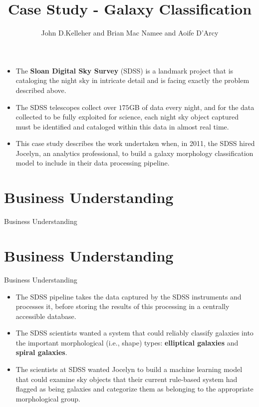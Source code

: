 \documentclass[xcolor={table}]{beamer}
\title{Case Study - Galaxy Classification}
\author{John D.Kelleher and Brian Mac Namee and Aoife D'Arcy}
\institute{}
\date{}
\newcommand{\SectionSlide}[2][]{
	\ifthenelse{\isempty{#1}}
		{\section{#2}\begin{frame} \begin{center}\begin{huge}#2\end{huge}\end{center}\end{frame}}
		{\section[#1]{#2}\begin{frame} \begin{center}\begin{huge}#2\end{huge}\end{center}\end{frame}}
}
\newcommand{\keyword}[1]{\alert{\textbf{#1}}\index{#1}}
\begin{document}
\begin{frame}
	\titlepage
\end{frame}
\begin{frame}
	 \tableofcontents
\end{frame}


 \begin{frame} 
 \begin{itemize}
\item The \keyword{Sloan Digital Sky Survey} (SDSS) is a landmark project that is cataloging the night sky in intricate detail and is facing exactly the problem described above.
\item The SDSS telescopes collect over $175$GB of data every night, and for the data collected to be fully exploited for science, each night sky object captured must be identified and cataloged within this data in almost real time. 
\item This case study describes the work undertaken when, in 2011, the SDSS hired Jocelyn, an analytics professional, to build a galaxy morphology classification model to include in their data processing pipeline. 
\end{itemize}
\end{frame} 


\SectionSlide{Business  Understanding}

 \begin{frame} 
 \begin{itemize}
\item The SDSS pipeline takes the data captured by the SDSS instruments and processes it, before storing the results of this processing in a centrally accessible database. 
\item The SDSS scientists wanted a system that could reliably classify galaxies into the important morphological (i.e., shape) types:  \textbf{elliptical galaxies} and \textbf{spiral galaxies}. 
\item The scientists at SDSS wanted Jocelyn to build a machine learning model that could examine sky objects that their current rule-based system had flagged as being galaxies and categorize them as belonging to the appropriate morphological group. 
\end{itemize}
\end{frame} 
\end{document}
